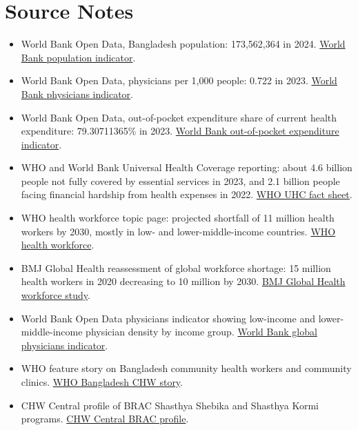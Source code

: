 \documentclass[11pt,letterpaper]{article}
\begin{document}
\section{Source Notes}

\begin{itemize}
  \item World Bank Open Data, Bangladesh population: 173,562,364 in 2024. \href{https://data.worldbank.org/indicator/SP.POP.TOTL?locations=BD}{World Bank population indicator}.
  \item World Bank Open Data, physicians per 1,000 people: 0.722 in 2023. \href{https://data.worldbank.org/indicator/SH.MED.PHYS.ZS?locations=BD}{World Bank physicians indicator}.
  \item World Bank Open Data, out-of-pocket expenditure share of current health expenditure: 79.30711365\% in 2023. \href{https://data.worldbank.org/indicator/SH.XPD.OOPC.CH.ZS?locations=BD}{World Bank out-of-pocket expenditure indicator}.
  \item WHO and World Bank Universal Health Coverage reporting: about 4.6 billion people not fully covered by essential services in 2023, and 2.1 billion people facing financial hardship from health expenses in 2022. \href{https://www.who.int/news-room/fact-sheets/detail/universal-health-coverage-\%28uhc\%29}{WHO UHC fact sheet}.
  \item WHO health workforce topic page: projected shortfall of 11 million health workers by 2030, mostly in low- and lower-middle-income countries. \href{https://www.who.int/health-topics/health-workforce}{WHO health workforce}.
  \item BMJ Global Health reassessment of global workforce shortage: 15 million health workers in 2020 decreasing to 10 million by 2030. \href{https://gh.bmj.com/content/7/6/e009316}{BMJ Global Health workforce study}.
  \item World Bank Open Data physicians indicator showing low-income and lower-middle-income physician density by income group. \href{https://data.worldbank.org/indicator/SH.MED.PHYS.ZS}{World Bank global physicians indicator}.
  \item WHO feature story on Bangladesh community health workers and community clinics. \href{https://www.who.int/news-room/feature-stories/detail/bangladesh-community-health-workers-at-the-heart-of-a-stronger-health-system-and-the-fight-against-covid-19}{WHO Bangladesh CHW story}.
  \item CHW Central profile of BRAC Shasthya Shebika and Shasthya Kormi programs. \href{https://chwcentral.org/the-brac-shasthya-shebika-and-shasthya-kormi-community-health-workers-in-bangladesh/}{CHW Central BRAC profile}.

\end{itemize}
\end{document}
